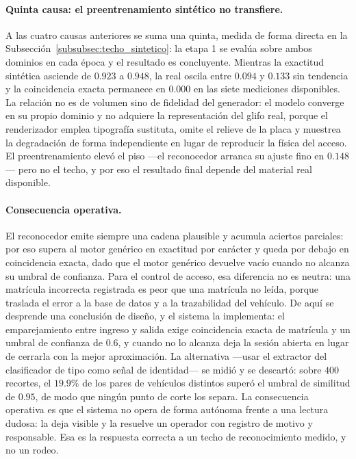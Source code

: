 \paragraph{Quinta causa: el preentrenamiento sintético no transfiere.}
A las cuatro causas anteriores se suma una quinta, medida de forma directa en la
Subsección~\ref{subsubsec:techo_sintetico}: la etapa 1 se evalúa sobre ambos
dominios en cada época y el resultado es concluyente. Mientras la exactitud
sintética asciende de $0{.}923$ a $0{.}948$, la real oscila entre $0{.}094$ y
$0{.}133$ sin tendencia y la coincidencia exacta permanece en $0{.}000$ en las
siete mediciones disponibles. La relación no es de volumen sino de fidelidad del
generador: el modelo converge en su propio dominio y no adquiere la representación
del glifo real, porque el renderizador emplea tipografía sustituta, omite el
relieve de la placa y muestrea la degradación de forma independiente en lugar de
reproducir la física del acceso. El preentrenamiento elevó el piso
---el reconocedor arranca su ajuste fino en $0{.}148$--- pero no el techo, y por
eso el resultado final depende del material real disponible.

\paragraph{Consecuencia operativa.}
El reconocedor emite siempre una cadena plausible y acumula aciertos parciales:
por eso supera al motor genérico en exactitud por carácter y queda por debajo en
coincidencia exacta, dado que el motor genérico devuelve vacío cuando no alcanza
su umbral de confianza. Para el control de acceso, esa diferencia no es neutra:
una matrícula incorrecta registrada es peor que una matrícula no leída, porque
traslada el error a la base de datos y a la trazabilidad del vehículo. De aquí se
desprende una conclusión de diseño, y el sistema la implementa: el emparejamiento
entre ingreso y salida exige coincidencia exacta de matrícula y un umbral de
confianza de $0{.}6$, y cuando no lo alcanza deja la sesión abierta en lugar de
cerrarla con la mejor aproximación. La alternativa ---usar el extractor del
clasificador de tipo como señal de identidad--- se midió y se descartó: sobre
$400$ recortes, el $19{.}9\%$ de los pares de vehículos distintos superó el umbral
de similitud de $0{.}95$, de modo que ningún punto de corte los separa. La
consecuencia operativa es que el sistema no opera de forma autónoma frente a una
lectura dudosa: la deja visible y la resuelve un operador con registro de motivo y
responsable. Esa es la respuesta correcta a un techo de reconocimiento medido, y
no un rodeo. 

